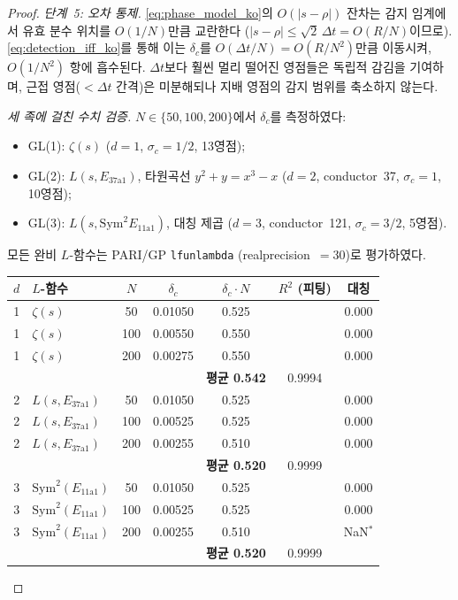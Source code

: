 \documentclass[11pt, a4paper]{article}
\theoremstyle{definition}
\theoremstyle{plain}
\begin{document}
\begin{proof}
\smallskip\noindent
\emph{단계~5: 오차 통제.}\;
\eqref{eq:phase_model_ko}의 $O(|s{-}\rho|)$ 잔차는 감지 임계에서
유효 분수 위치를 $O(1/N)$만큼 교란한다
($|s{-}\rho| \le \sqrt{2}\,\Delta t = O(R/N)$이므로).
\eqref{eq:detection_iff_ko}를 통해 이는 $\delta_c$를
$O(\Delta t/N) = O(R/N^2)$만큼 이동시켜,
$O(1/N^2)$ 항에 흡수된다.
$\Delta t$보다 훨씬 멀리 떨어진 영점들은 독립적 감김을 기여하며,
근접 영점($< \Delta t$ 간격)은 미분해되나
지배 영점의 감지 범위를 축소하지 않는다.

\medskip\noindent
\emph{세 족에 걸친 수치 검증.}\;
$N \in \{50, 100, 200\}$에서 $\delta_c$를 측정하였다:
\begin{itemize}
\item GL(1): $\zeta(s)$ ($d{=}1$, $\sigma_c{=}1/2$, 13영점);
\item GL(2): $L(s,E_{37\mathrm{a}1})$, 타원곡선
      $y^2{+}y = x^3{-}x$ ($d{=}2$, conductor~37, $\sigma_c{=}1$, 10영점);
\item GL(3): $L(s, \mathrm{Sym}^2 E_{11\mathrm{a}1})$, 대칭 제곱
      ($d{=}3$, conductor~121, $\sigma_c{=}3/2$, 5영점).
\end{itemize}
모든 완비 $L$-함수는 PARI/GP
\texttt{lfunlambda} (realprecision~$=30$)로 평가하였다.

\begin{center}
\begin{tabular}{clccccc}
\toprule
$d$ & $L$-함수 & $N$ & $\delta_c$ & $\delta_c \cdot N$
    & $R^2$ (피팅) & 대칭 \\
\midrule
1 & $\zeta(s)$ & 50  & 0.01050 & 0.525 & & 0.000 \\
1 & $\zeta(s)$ & 100 & 0.00550 & 0.550 & & 0.000 \\
1 & $\zeta(s)$ & 200 & 0.00275 & 0.550 & & 0.000 \\
  &            &     &         & \textbf{평균 0.542} & 0.9994 & \\
\midrule
2 & $L(s,E_{37\mathrm{a}1})$ & 50  & 0.01050 & 0.525 & & 0.000 \\
2 & $L(s,E_{37\mathrm{a}1})$ & 100 & 0.00525 & 0.525 & & 0.000 \\
2 & $L(s,E_{37\mathrm{a}1})$ & 200 & 0.00255 & 0.510 & & 0.000 \\
  &            &     &         & \textbf{평균 0.520} & 0.9999 & \\
\midrule
3 & $\mathrm{Sym}^2(E_{11\mathrm{a}1})$ & 50  & 0.01050 & 0.525 & & 0.000 \\
3 & $\mathrm{Sym}^2(E_{11\mathrm{a}1})$ & 100 & 0.00525 & 0.525 & & 0.000 \\
3 & $\mathrm{Sym}^2(E_{11\mathrm{a}1})$ & 200 & 0.00255 & 0.510 & & NaN$^*$ \\
  &            &     &         & \textbf{평균 0.520} & 0.9999 & \\
\bottomrule
\end{tabular}
\end{center}


\end{proof}
\end{document}

